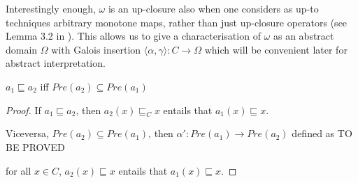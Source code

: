 \documentclass{llncs}
\begin{document}
Interestingly enough, $\omega$ is an up-closure also when one considers as up-to techniques arbitrary monotone maps, rather than just up-closure operators (see Lemma 3.2 in \cite{pous2016coinduction}).
This allows us to give a characterisation of $\omega$ as an abstract domain $\Omega$ with Galois insertion $\langle \alpha,\gamma\rangle \colon C \to \Omega$ which will be convenient later for abstract interpretation. %

\begin{lemma}\label{lemma:inclusion}
$a_1\sqsubseteq a_2$ iff $Pre(a_2) \subseteq Pre(a_1)$
\end{lemma}
\begin{proof}
If $a_1\sqsubseteq a_2$, then $a_2(x)\sqsubseteq_C x$ entails that $a_1(x)\sqsubseteq x$. 

Viceversa, $Pre(a_2) \subseteq Pre(a_1)$, then $\alpha'\colon Pre(a_1) \to Pre(a_2)$ defined as TO BE PROVED

for all $x\in C$, $a_2(x) \sqsubseteq x$ entails that $a_1(x) \sqsubseteq x$.
\end{proof}
\end{document}
